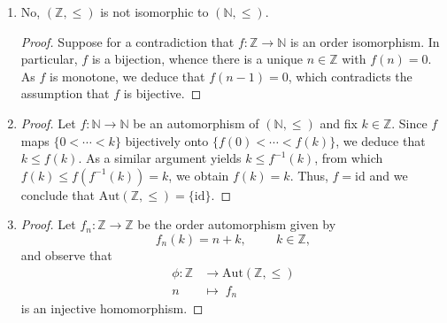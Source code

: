 \documentclass{article}
\newcommand{\Z}{\mathbb{Z}}
\newcommand{\N}{\mathbb{N}}
\begin{document}
\begin{enumerate}
\begin{proof}
\begin{align*}
					e	\mapsto	0.
			\end{align*}
			Since $f$ is not a bijection, it follows that $f$ is not an isomorphism.
		\end{proof}
	\item No, $(\Z,\leq)$ is not isomorphic to $(\N,\leq)$.
		\begin{proof}
			Suppose for a contradiction that $f:\Z\to\N$ is an order isomorphism. In particular, $f$ is a bijection, whence there is a unique $n\in \Z$ with $f(n)=0$. As $f$ is monotone, we deduce that $f(n-1)=0$, which contradicts the assumption that $f$ is bijective.
		\end{proof}
	\item 
		\begin{proof}
			Let $f:\N\to\N$ be an automorphism of $(\N,\leq)$ and fix $k\in \Z$. Since $f$ maps $\{0<\cdots< k\}$ bijectively onto $\{f(0)<\cdots<f(k)\}$, we deduce that $k\leq f(k)$. As a similar argument yields $k\leq f^{-1}(k)$, from which $f(k)\leq f(f^{-1}(k))=k$, we obtain $f(k)=k$. Thus, $f=\mathrm{id}$ and we conclude that $\mathrm{Aut}(\Z,\leq) = \{\mathrm{id}\}$.
		\end{proof}
	\item 
		\begin{proof}
			Let $f_n:\Z\to\Z$ be the order automorphism given by
			\[
				f_n(k) = n + k,		\hspace{1cm}k\in\Z,
			\]
			and observe that
			\begin{align*}
				\phi :	\Z	&\longrightarrow	\mathrm{Aut}(\Z,\leq)		\\
					n	&\longmapsto		\;f_n
			\end{align*}
			is an injective homomorphism.


\end{proof}
\end{enumerate}
\end{document}
